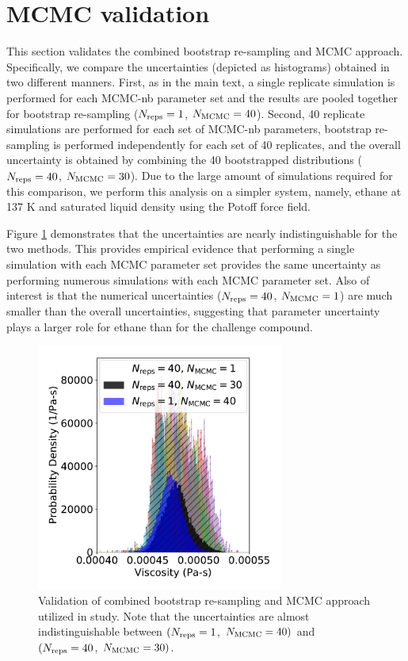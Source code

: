 \documentclass[preprint,review,11pt]{elsarticle}
\begin{document}
	\section{MCMC validation} \label{SI:MCMC_analysis}
	
	This section validates the combined bootstrap re-sampling and MCMC approach. Specifically, we compare the uncertainties (depicted as histograms) obtained in two different manners. First, as in the main text, a single replicate simulation is performed for each MCMC-nb parameter set and the results are pooled together for bootstrap re-sampling ($N_{\rm reps} = 1$, $N_{\rm MCMC} = 40$). Second, 40 replicate simulations are performed for each set of MCMC-nb parameters, bootstrap re-sampling is performed independently for each set of 40 replicates, and the overall uncertainty is obtained by combining the 40 bootstrapped distributions ($N_{\rm reps} = 40$, $N_{\rm MCMC} = 30$). Due to the large amount of simulations required for this comparison, we perform this analysis on a simpler system, namely, ethane at 137 K and saturated liquid density using the Potoff force field. 
	
	Figure \ref{fig:MCMC_validation} demonstrates that the uncertainties are nearly indistinguishable for the two methods. This provides empirical evidence that performing a single simulation with each MCMC parameter set provides the same uncertainty as performing numerous simulations with each MCMC parameter set. Also of interest is that the numerical uncertainties ($N_{\rm reps} = 40$, $N_{\rm MCMC} = 1$) are much smaller than the overall uncertainties, suggesting that parameter uncertainty plays a larger role for ethane than for the challenge compound.
	
	\begin{figure}[htb!]
		\centering
		\includegraphics[width=3.2in]{MCMC_validation.pdf}
		\caption{Validation of combined bootstrap re-sampling and MCMC approach utilized in study. Note that the uncertainties are almost indistinguishable between $(N_{\rm reps} = 1$, $N_{\rm MCMC} = 40)$ and $(N_{\rm reps} = 40$, $N_{\rm MCMC} = 30)$.}
		\label{fig:MCMC_validation}
	\end{figure}
	
\end{document}
